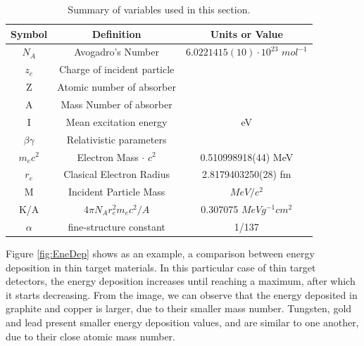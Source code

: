 \begin{table}[h!]
    \centering
    \begin{tabular}{ccc}
    \hline
    \textbf{Symbol}                  & \textbf{Definition}                  & \textbf{Units or Value}                                               \\ \hline
    $N_A$                      & Avogadro's Number           & $6.0221415(10)\cdot10^23$ $mol^{-1}$ \\
    $z_e$                      & Charge of incident particle &                                                              \\
    Z                       & Atomic number of absorber   &                                                              \\
    A                       & Mass Number of absorber     &                                                              \\
    I                       & Mean excitation energy      & eV                                                           \\
    $\beta \gamma$              & Relativistic parameters     &                                                              \\
    $m_e c^2$ & Electron Mass $\cdot$ $c^2$          & 0.510998918(44) MeV                                          \\
    $r_e$                      & Clasical Electron Radius    & 2.8179403250(28) fm                                          \\
    M                       & Incident Particle Mass      & $MeV/c^2$\\
    
    K/A                     & $4 \pi N_A r_e^2 m_e c^2/A$ & 0.307075 $MeV g^{-1} cm^2$  \\
     $\alpha$ & fine-structure constant & 1/137 \\ 
     \hline
    \end{tabular}
    \caption{Summary of variables used in this section.}
    \label{tab:ParBethe}
\end{table}


 Figure \ref{fig:EneDep} shows as an example, a comparison between energy deposition in thin target materials. In this particular case of thin target detectors, the energy deposition increases until reaching a maximum, after which it starts decreasing. From the image, we can observe that the energy deposited in graphite and copper is larger, due to their smaller mass number. Tungsten, gold and lead present smaller energy deposition values, and are similar to one another, due to their close atomic mass number. 

